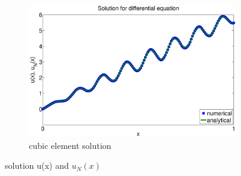 \documentclass[paper=a4, fontsize=11pt]{article} %
\begin{document}
\begin{figure}
\begin{subfigure}[b]{0.6\textwidth}
                \includegraphics[width=\textwidth]{solution_P3.eps}
                \caption{cubic element solution}
                \label{fig:k8}
        \end{subfigure}

        \caption{solution u(x) and $u_N(x)$}\label{fig:solution}
\end{figure}

\end{document}
